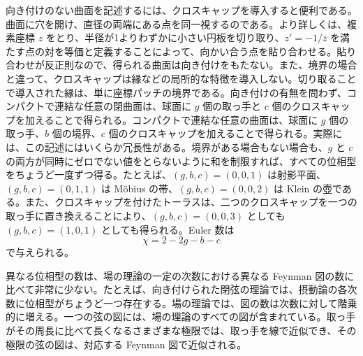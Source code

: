 向き付けのない曲面を記述するには、クロスキャップを導入すると便利である。曲面に穴を開け、直径の両端にある点を同一視するのである。より詳しくは、複素座標 $z$ をとり、半径が1よりわずかに小さい円板を切り取り、$z'=-1/\bar z$ を満たす点の対を等価と定義することによって、向かい合う点を貼り合わせる。貼り合わせが反正則なので、得られる曲面は向き付けをもたない。また、境界の場合と違って、クロスキャップは縁などの局所的な特徴を導入しない。切り取ることで導入された縁は、単に座標パッチの境界である。向き付けの有無を問わず、コンパクトで連結な任意の閉曲面は、球面に $g$ 個の取っ手と $c$ 個のクロスキャップを加えることで得られる。コンパクトで連結な任意の曲面は、球面に $g$ 個の取っ手、$b$ 個の境界、$c$ 個のクロスキャップを加えることで得られる。実際には、この記述にはいくらか冗長性がある。境界がある場合もない場合も、$g$ と $c$ の両方が同時にゼロでない値をとらないように和を制限すれば、すべての位相型をちょうど一度ずつ得る。たとえば、$(g,b,c)=(0,0,1)$ は射影平面、$(g,b,c)=(0,1,1)$ は Möbius の帯、$(g,b,c)=(0,0,2)$ は Klein の壺である。また、クロスキャップを付けたトーラスは、二つのクロスキャップを一つの取っ手に置き換えることにより、$(g,b,c)=(0,0,3)$ としても $(g,b,c)=(1,0,1)$ としても得られる。Euler 数は
\begin{equation}
\chi=2-2g-b-c
\tag{3.5.6}\label{eq:3.5.6}
\end{equation}
で与えられる。

異なる位相型の数は、場の理論の一定の次数における異なる Feynman 図の数に比べて非常に少ない。たとえば、向き付けられた閉弦の理論では、摂動論の各次数に位相型がちょうど一つ存在する。場の理論では、図の数は次数に対して階乗的に増える。一つの弦の図には、場の理論のすべての図が含まれている。取っ手がその周長に比べて長くなるさまざまな極限では、取っ手を線で近似でき、その極限の弦の図は、対応する Feynman 図で近似される。
